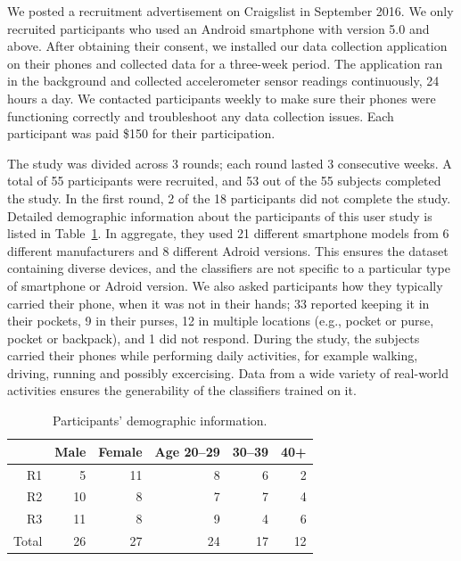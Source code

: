 We posted a recruitment advertisement on Craigslist in September 2016. 
We only recruited participants who used an Android smartphone with version 5.0 and above. 
After obtaining their consent, we installed our data collection application on their phones and collected data for a three-week period.
The application ran in the background and collected accelerometer sensor readings continuously, 24 hours a day.
We contacted participants weekly to make sure their phones were functioning correctly and troubleshoot any data collection issues.
Each participant was paid \$150 for their participation.

The study was divided across 3 rounds; each round lasted 3 consecutive weeks. 
A total of 55 participants were recruited, and
53 out of the 55 subjects completed the study. 
In the first round, 2 of the 18 participants did not complete the study.
Detailed demographic information about the participants of this user study is listed in Table~\ref{tbl:demographics}.
In aggregate, they used 21 different smartphone models from 6 different manufacturers and 8 different Adroid versions. This ensures the dataset containing diverse devices, and the classifiers are not specific to a particular type of smartphone or Adroid version.
We also asked participants how they typically carried their phone, when it was not in their hands; 33 reported keeping it in their pockets, 9 in their purses, 12 in multiple locations (e.g., pocket or purse, pocket or backpack), and 1 did not respond.
During the study, the subjects carried their phones while performing daily activities, for example walking, driving, running and possibly excercising. Data from a wide variety of real-world activities ensures the generability of the classifiers trained on it. 

\begin{table}[H]
\centering
\begin{tabular}{rrrrrr}
\hline
      & Male & Female & Age 20--29 & 30--39 & 40+ \\ \hline
R1    & 5    & 11     & 8         & 6     & 2   \\
R2    & 10   & 8      & 7         & 7     & 4   \\
R3    & 11   & 8      & 9         & 4     & 6   \\
Total & 26   & 27     & 24        & 17    & 12  \\ \hline
\end{tabular}
\caption{Participants' demographic information.}
\label{tbl:demographics}
\end{table}




